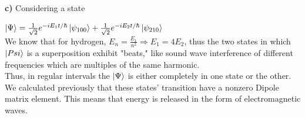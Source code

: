 \documentclass[10pt]{article}
\begin{document}
\textbf{ c) } Considering a state 

$\ket{\Psi}=\frac{1}{\sqrt{2}}e^{-iE_1t/\hbar}\ket{\psi_{100}}+\frac{1}{\sqrt{2}}e^{-iE_2t/\hbar}\ket{\psi_{210}}$\\

We know that for hydrogen, $E_n=\frac{E_1}{n^2}\Rightarrow E_1=4E_2$, thus the two states in which $\ket{Psi}$ is a superposition exhibit "beats," like sound wave interference of different frequencies which are multiples of the same harmonic.\\

Thus, in regular intervals the $\ket{\Psi}$ is either completely in one state or the other.\\
We calculated previously that these states' transition have a nonzero Dipole matrix element. This means that energy is released in the form of electromagnetic waves.\\
\end{document}
